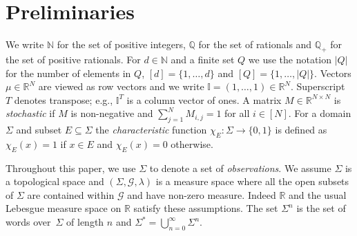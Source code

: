 \documentclass[a4paper,UKenglish,cleveref, autoref,mathscr, amsthm, thmtools, thm-restate]{lipics-v2019}
\newcommand{\RR}{\mathbb{R}}
\newcommand{\NN}{\mathbb{N}}
\newcommand{\QQ}{\mathbb{Q}}
\newcommand{\GG}{\mathscr{G}}
\newcommand{\1}{\mathbb{I}}
\begin{document}
%





\section{Preliminaries}
We write $\NN$ for the set of positive integers, $\QQ$ for the set of rationals and $\QQ_+$ for the set of positive rationals.
For $d \in \NN$ and a finite set $Q$ we use the notation $|Q|$ for the number of elements in $Q$, $[d] = \{1, \dots, d\}$ and $[Q] = \{1, \dots, |Q|\}$. Vectors $\mu \in \RR^N$ are viewed as row vectors and we write $\1 = (1, \dots, 1) \in \RR^N$.
Superscript~$T$ denotes transpose; e.g., $\1^T$ is a column vector of ones.
A matrix $M \in \RR^{N \times N}$ is \emph{stochastic} if $M$ is non-negative and $\sum_{j = 1}^{N} M_{i,j} = 1$ for all $i \in [N]$.
For a domain $\Sigma$ and subset $E \subseteq \Sigma$ the \emph{characteristic} function $\chi_E : \Sigma \rightarrow \{0,1\}$ is defined as $\chi_E(x) = 1$ if $x \in E$ and $\chi_E(x) = 0$ otherwise.

Throughout this paper, we use $\Sigma$ to denote a set of \emph{observations}.
We assume $\Sigma$ is a topological space and $(\Sigma, \GG, \lambda)$ is a measure space where all the open subsets of $\Sigma$ are contained within $\GG$ and have non-zero measure. Indeed $\RR$ and the usual Lebesgue measure space on $\RR$ satisfy these assumptions.
The set $\Sigma^n$ is the set of words over~$\Sigma$ of length $n$ and $\Sigma^* = \bigcup_{n = 0}^\infty \Sigma^n$.
\end{document}
